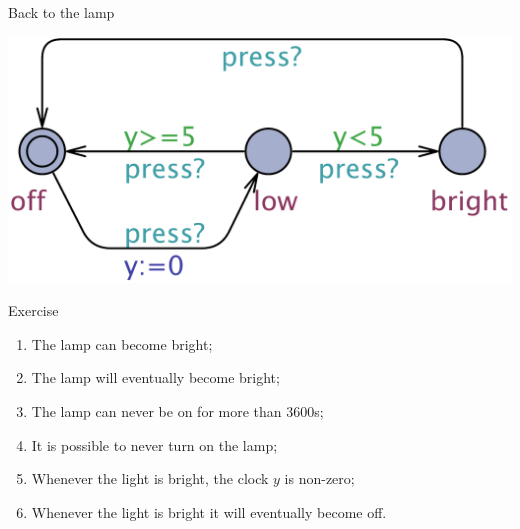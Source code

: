 \documentclass{beamer}
\begin{document}
\begin{frame}{Back to the lamp}

        \centering
        \includegraphics[scale=0.25]{./images/Lamp.pdf}

        \begin{block}{Exercise}
	\begin{enumerate}
                \item The lamp can become bright;
                \item The lamp will eventually become bright;
                \item The lamp can never be on for more than 3600s;
                \item It is possible to never turn on the lamp;
                \item Whenever the light is bright, the clock $y$
                        is non-zero;
                \item Whenever the light is bright it will eventually
                        become off.
	\end{enumerate}
        \end{block}
\end{frame}
\end{document}

